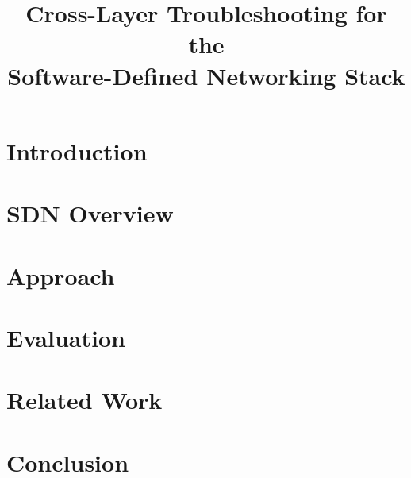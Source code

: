 \documentclass{sig-alternate-10pt}
\title{\vspace{-40pt}Cross-Layer Troubleshooting for the \\ Software-Defined Networking Stack}
\author{

}
\date{}
\begin{document}
    \maketitle

\abstract{{\it }}

\section{Introduction}
\label{sec:intro}


\section{SDN Overview}
\label{sec:overview}


\section{Approach}
\label{sec:approach}


\section{Evaluation}
\label{sec:evaluation}


\section{Related Work}
\label{sec:related_work}


\section{Conclusion}
\label{sec:conclusion}





%
\end{document}

